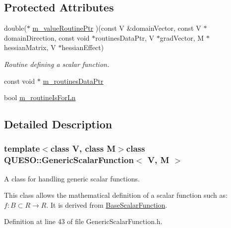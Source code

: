 \subsection*{Protected Attributes}
\begin{DoxyCompactItemize}
\item 
double($\ast$ \hyperlink{class_q_u_e_s_o_1_1_generic_scalar_function_a9feaa5ee6ceb321fde56c5dd4dc48f2f}{m\-\_\-value\-Routine\-Ptr} )(const V \&domain\-Vector, const V $\ast$domain\-Direction, const void $\ast$routines\-Data\-Ptr, V $\ast$grad\-Vector, M $\ast$hessian\-Matrix, V $\ast$hessian\-Effect)
\begin{DoxyCompactList}\small\item\em Routine defining a scalar function. \end{DoxyCompactList}\item 
const void $\ast$ \hyperlink{class_q_u_e_s_o_1_1_generic_scalar_function_a46b2964caebcd2e22f913f86798bdf36}{m\-\_\-routines\-Data\-Ptr}
\item 
bool \hyperlink{class_q_u_e_s_o_1_1_generic_scalar_function_a22e044d791d578453734356587bd7e65}{m\-\_\-routine\-Is\-For\-Ln}
\end{DoxyCompactItemize}


\subsection{Detailed Description}
\subsubsection*{template$<$class V, class M$>$class Q\-U\-E\-S\-O\-::\-Generic\-Scalar\-Function$<$ V, M $>$}

A class for handling generic scalar functions. 

This class allows the mathematical definition of a scalar function such as\-: $ f: B \subset R \rightarrow R $. It is derived from \hyperlink{class_q_u_e_s_o_1_1_base_scalar_function}{Base\-Scalar\-Function}. 

Definition at line 43 of file Generic\-Scalar\-Function.\-h.



